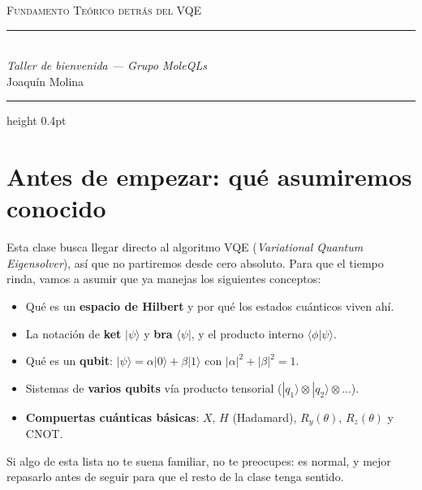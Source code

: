 \documentclass[12pt]{article}
\newcommand{\tituloClase}{Fundamento Teórico detrás del VQE}
\newcommand{\subtituloClase}{Taller de bienvenida --- Grupo MoleQLs}
\newcommand{\nombreProfesor}{Joaquín Molina}
\begin{document}
\begin{center}
    {\Huge\scshape \tituloClase}\\[0.35cm]
    {\color{linea}\rule{0.35\textwidth}{0.4pt}}\\[0.35cm]
    {\large\itshape \subtituloClase}\\[0.25cm]
    {\normalsize \nombreProfesor}
\end{center}

\vspace{0.6cm}
{\color{linea}\hrule height 0.4pt}
\vspace{0.6cm}

\section{Antes de empezar: qué asumiremos conocido}

Esta clase busca llegar directo al algoritmo VQE (\textit{Variational Quantum
Eigensolver}), así que no partiremos desde cero absoluto. Para que el tiempo
rinda, vamos a asumir que ya manejas los siguientes conceptos:

\begin{importante}[title=\textbf{Prerrequisitos asumidos}]
\begin{itemize}
    \item Qué es un \textbf{espacio de Hilbert} y por qué los estados
    cuánticos viven ahí.
    \item La notación de \textbf{ket} $|\psi\rangle$ y \textbf{bra}
    $\langle\psi|$, y el producto interno $\langle\phi|\psi\rangle$.
    \item Qué es un \textbf{qubit}: $|\psi\rangle = \alpha|0\rangle +
    \beta|1\rangle$ con $|\alpha|^2 + |\beta|^2 = 1$.
    \item Sistemas de \textbf{varios qubits} vía producto tensorial
    ($|q_1\rangle \otimes |q_2\rangle \otimes \dots$).
    \item \textbf{Compuertas cuánticas básicas}: $X$, $H$ (Hadamard),
    $R_y(\theta)$, $R_z(\theta)$ y CNOT.
\end{itemize}
\end{importante}

Si algo de esta lista no te suena familiar, no te preocupes: es normal, y
mejor repasarlo antes de seguir para que el resto de la clase tenga sentido.
\end{document}
